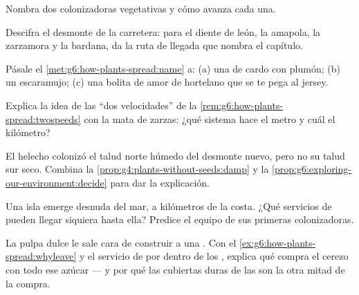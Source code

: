 \begin{exercise}[$\star$]\label{exo:g6:how-plants-spread:6}
Nombra dos colonizadoras vegetativas y cómo avanza cada una.
\end{exercise}

\begin{exercise}[$\star\star$]\label{exo:g6:how-plants-spread:7}
Descifra el desmonte de la carretera: para el diente de león, la
amapola, la zarzamora y la bardana, da la ruta de llegada que nombra el
capítulo.
\end{exercise}

\begin{exercise}[$\star\star$]\label{exo:g6:how-plants-spread:8}
Pásale el \cref{met:g6:how-plants-spread:name} a: (a) una  de
cardo con plumón; (b) un escaramujo; (c) una bolita de amor de
hortelano que se te pega al jersey.
\end{exercise}

\begin{exercise}[$\star\star$]\label{exo:g6:how-plants-spread:9}
Explica la idea de las ``dos velocidades'' de la
\cref{rem:g6:how-plants-spread:twospeeds} con la mata de zarzas: ¿qué
sistema hace el metro y cuál el kilómetro?
\end{exercise}

\begin{exercise}[$\star\star$]\label{exo:g6:how-plants-spread:10}
El helecho colonizó el talud norte húmedo del desmonte nuevo, pero no
su talud sur seco. Combina la
\cref{prop:g4:plants-without-seeds:damp} y la
\cref{prop:g6:exploring-our-environment:decide} para dar la explicación.
\end{exercise}

\begin{exercise}[$\star\star$]\label{exo:g6:how-plants-spread:11}
Una isla emerge desnuda del mar, a kilómetros de la costa. ¿Qué
servicios de  pueden llegar siquiera hasta ella? Predice el
equipo de sus primeras  colonizadoras.
\end{exercise}

\begin{exercise}[$\star\star\star$]\label{exo:g6:how-plants-spread:12}
La pulpa dulce le sale cara de construir a una . Con el
\cref{ex:g6:how-plants-spread:whyleave} y el servicio de por dentro de
los , explica qué compra el cerezo con todo ese azúcar --- y
por qué las cubiertas duras de las  son la otra mitad de la
compra.
\end{exercise}

